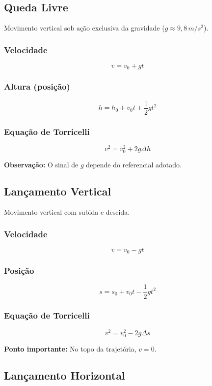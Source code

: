 \documentclass[a4paper,12pt]{article}
\begin{document}
\subsection{Queda Livre}

Movimento vertical sob ação exclusiva da gravidade ($g \approx 9{,}8\,m/s^2$).

\subsubsection{Velocidade}
\[
v = v_0 + gt
\]

\subsubsection{Altura (posição)}
\[
h = h_0 + v_0 t + \frac{1}{2}gt^2
\]

\subsubsection{Equação de Torricelli}
\[
v^2 = v_0^2 + 2g\Delta h
\]

\textbf{Observação:} O sinal de $g$ depende do referencial adotado.

\subsection{Lançamento Vertical}

Movimento vertical com subida e descida.

\subsubsection{Velocidade}
\[
v = v_0 - gt
\]

\subsubsection{Posição}
\[
s = s_0 + v_0 t - \frac{1}{2}gt^2
\]

\subsubsection{Equação de Torricelli}
\[
v^2 = v_0^2 - 2g\Delta s
\]

\textbf{Ponto importante:} No topo da trajetória, $v = 0$.

\subsection{Lançamento Horizontal}
\end{document}
